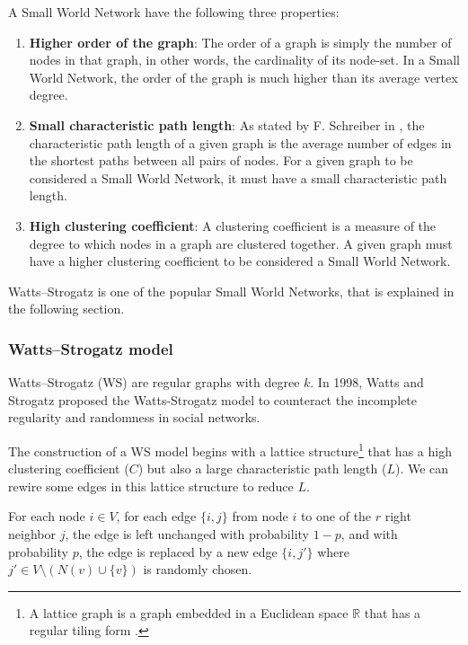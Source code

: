A Small World Network have the following three properties:
\begin{enumerate}
    \item \textbf{Higher order of the graph}: The order of a graph is simply the number of nodes in that graph, in other words, the cardinality of its node-set. In a Small World Network, the order of the graph is much higher than its average vertex degree.
    
    \item \textbf{Small characteristic path length}: As stated by F. Schreiber in \cite{schreiber}, the characteristic path length of a given graph is the average number of edges in the shortest paths between all pairs of nodes. For a given graph to be considered a Small World Network, it must have a small characteristic path length.
    
    \item \textbf{High clustering coefficient}: A clustering coefficient is a measure of the degree to which nodes in a graph are clustered together. A given graph must have a higher clustering coefficient to be considered a Small World Network.
\end{enumerate}

Watts–Strogatz is one of the popular Small World Networks, that is explained in the following section.

\subsubsection{Watts–Strogatz model}\label{subsubsection:wsmodel}
Watts–Strogatz (WS) are regular graphs with degree $k$. In 1998, Watts and Strogatz \cite{watts} proposed the Watts-Strogatz model to counteract the incomplete regularity and randomness in social networks.

The construction of a WS model begins with a lattice structure\footnote{A lattice graph is a graph embedded in a Euclidean space $\mathbb{R}$ that has a regular tiling form  \cite{lattice}.} that has a high clustering coefficient ($C$) but also a large characteristic path length ($L$). We can rewire some edges in this lattice structure to reduce $L$.

For each node $i \in V$, for each edge $\{i, j\}$ from node $i$ to one of the $r$ right neighbor $j$, the edge is left unchanged with probability $1-p$, and with probability $p$, the edge is replaced by a new edge $\{i, j\prime\}$ where $j\prime\in V \setminus (N(v) \cup \{v\})$ is randomly chosen.

